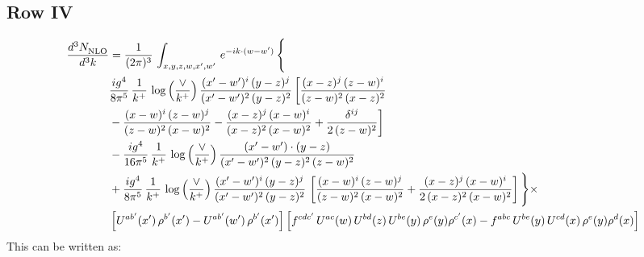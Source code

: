 \documentclass[9pt]{article}
\numberwithin{equation}{section}
\begin{document}
\subsection{Row IV}
\begin{align}
    \frac{d^{3}N_{\rm NLO}^{\rm}}{d^{3}k}  & =   \frac{1}{(2\pi)^{3}}\,
    \int_{x,y,z,w,x',w'}\,e^{-ik\cdot (w-w^\prime)}\,\Bigg\{\notag \\
& \frac{ig^{4}}{8\pi^{5}}\,\frac{1}{k^{+}}\,\log{\left(\frac{\vee}{k^{+}}\right)}\,\frac{(x'-w')^{i}\,(y-z)^{j}}{(x'-w')^{2}\,(y-z)^{2}}\,\bigg[\frac{(x-z)^{j}\,(z-w)^{i}}{(z-w)^{2}\,(x-z)^{2}}\notag \\ & -\frac{(x-w)^{i}\,(z-w)^{j}}{(z-w)^{2}\,(x-w)^{2}}-\frac{(x-z)^{j}\,(x-w)^{i}}{(x-z)^{2}\,(x-w)^{2}}+\frac{\delta^{ij}}{2\,(z-w)^{2}}\bigg] \notag \\
& -\frac{ig^{4}}{16\pi^{5}}\,\frac{1}{k^{+}}\,\log{\left(\frac{\vee}{k^{+}}\right)} \,\frac{(x'-w')\cdot (y-z)}{(x'-w')^{2}\,(y-z)^{2}\,(z-w)^{2}}\notag \\
& + \frac{ig^{4}}{8\pi^{5}}\,\frac{1}{k^{+}}\,\log{\left(\frac{\vee}{k^{+}}\right)}\,\frac{(x'-w')^{i}\,(y-z)^{j}}{(x'-w')^{2}\,(y-z)^{2}}\,\left[\frac{(x-w)^{i}\,(z-w)^{j}}{(z-w)^{2}\,(x-w)^{2}}+\frac{(x-z)^{j}\,(x-w)^{i}}{2\, (x-z)^{2}\,(x-w)^{2}}\right]\Bigg\}\times\notag \\ &  \left[U^{ab'}(x')\,\rho^{b'}(x')-U^{ab'}(w')\,\rho^{b'}(x')\right] \left[f^{cdc'}\,U^{ac}(w)\,U^{bd}(z)\,U^{be}(y)\,\rho^{e}(y)\rho^{c'}(x)-f^{abc}\,U^{be}(y)\,U^{cd}(x)\,\rho^{e}(y)\rho^{d}(x)\right]
\end{align}
This can be written as:
\end{document}
